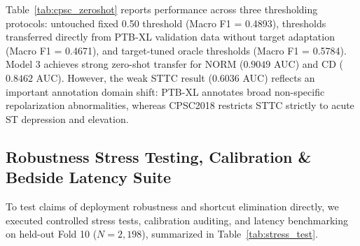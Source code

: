 \documentclass[5p,twocolumn,10pt]{elsarticle}
\begin{document}
\begin{table}[htbp]
\caption{Audited Zero-Shot Generalization on CPSC2018 ($N=6,877$) across Three Decision Threshold Regimes.}
\label{tab:cpsc_zeroshot}
\centering
\small
{}
\end{table}

Table~\ref{tab:cpsc_zeroshot} reports performance across three thresholding protocols: untouched fixed 0.50 threshold (Macro F1 = 0.4893), thresholds transferred directly from PTB-XL validation data without target adaptation (Macro F1 = 0.4671), and target-tuned oracle thresholds (Macro F1 = 0.5784). Model 3 achieves strong zero-shot transfer for NORM ($0.9049$ AUC) and CD ($0.8462$ AUC). However, the weak STTC result ($0.6036$ AUC) reflects an important annotation domain shift: PTB-XL annotates broad non-specific repolarization abnormalities, whereas CPSC2018 restricts STTC strictly to acute ST depression and elevation.

\subsection{Robustness Stress Testing, Calibration \& Bedside Latency Suite}
\label{sec:robustness_calibration_latency}
To test claims of deployment robustness and shortcut elimination directly, we executed controlled stress tests, calibration auditing, and latency benchmarking on held-out Fold 10 ($N = 2,198$), summarized in Table~\ref{tab:stress_test}.
\end{document}
